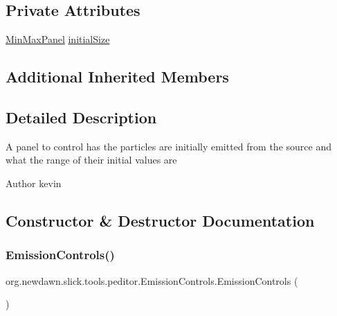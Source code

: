 \subsection*{Private Attributes}
\begin{DoxyCompactItemize}
\item 
\mbox{\hyperlink{classorg_1_1newdawn_1_1slick_1_1tools_1_1peditor_1_1_min_max_panel}{Min\+Max\+Panel}} \mbox{\hyperlink{classorg_1_1newdawn_1_1slick_1_1tools_1_1peditor_1_1_emission_controls_af1ec12d55f0bf1f45d7e55e0fdc2a945}{initial\+Size}}
\end{DoxyCompactItemize}
\subsection*{Additional Inherited Members}


\subsection{Detailed Description}
A panel to control has the particles are initially emitted from the source and what the range of their initial values are

\begin{DoxyAuthor}{Author}
kevin 
\end{DoxyAuthor}


\subsection{Constructor \& Destructor Documentation}
\mbox{\label{classorg_1_1newdawn_1_1slick_1_1tools_1_1peditor_1_1_emission_controls_ad66caf24e2baeffc2ed67aa237a499f3}} 
\subsubsection{\texorpdfstring{Emission\+Controls()}{EmissionControls()}}
{\footnotesize\ttfamily org.\+newdawn.\+slick.\+tools.\+peditor.\+Emission\+Controls.\+Emission\+Controls (\begin{DoxyParamCaption}{ }\end{DoxyParamCaption})\hspace{0.3cm}{\ttfamily [inline]}}

